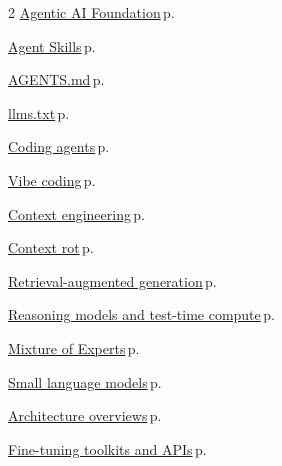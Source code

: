 \documentclass[10pt,a4paper,openany]{report}
\begin{document}
\begin{multicols}{2}
\hyperref[c:protocols-4]{Agentic AI Foundation}\,{\color{muted}\scriptsize p.\,\pageref{c:protocols-4}}\par\vspace{1pt}
\hyperref[c:protocols-5]{Agent Skills}\,{\color{muted}\scriptsize p.\,\pageref{c:protocols-5}}\par\vspace{1pt}
\hyperref[c:protocols-6]{AGENTS.md}\,{\color{muted}\scriptsize p.\,\pageref{c:protocols-6}}\par\vspace{1pt}
\hyperref[c:protocols-10]{llms.txt}\,{\color{muted}\scriptsize p.\,\pageref{c:protocols-10}}\par\vspace{1pt}
\hyperref[c:coding-0]{Coding agents}\,{\color{muted}\scriptsize p.\,\pageref{c:coding-0}}\par\vspace{1pt}
\hyperref[c:coding-1]{Vibe coding}\,{\color{muted}\scriptsize p.\,\pageref{c:coding-1}}\par\vspace{1pt}
\hyperref[c:context-0]{Context engineering}\,{\color{muted}\scriptsize p.\,\pageref{c:context-0}}\par\vspace{1pt}
\hyperref[c:context-1]{Context rot}\,{\color{muted}\scriptsize p.\,\pageref{c:context-1}}\par\vspace{1pt}
\hyperref[c:context-5]{Retrieval-augmented generation}\,{\color{muted}\scriptsize p.\,\pageref{c:context-5}}\par\vspace{1pt}
\hyperref[c:reasoning-0]{Reasoning models and test-time compute}\,{\color{muted}\scriptsize p.\,\pageref{c:reasoning-0}}\par\vspace{1pt}
\hyperref[c:arch-0]{Mixture of Experts}\,{\color{muted}\scriptsize p.\,\pageref{c:arch-0}}\par\vspace{1pt}
\hyperref[c:arch-11]{Small language models}\,{\color{muted}\scriptsize p.\,\pageref{c:arch-11}}\par\vspace{1pt}
\hyperref[c:arch-12]{Architecture overviews}\,{\color{muted}\scriptsize p.\,\pageref{c:arch-12}}\par\vspace{1pt}
\hyperref[c:training-6]{Fine-tuning toolkits and APIs}\,{\color{muted}\scriptsize p.\,\pageref{c:training-6}}\par\vspace{1pt}

\end{multicols}
\end{document}
